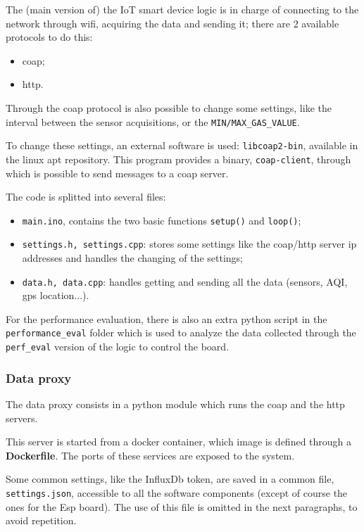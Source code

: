 \documentclass[]{article}
\begin{document}
The (main version of) the IoT smart device logic is in charge of connecting to the network through wifi, acquiring the data and sending it; there are 2 available protocols to do this:
\begin{itemize}
	\item coap;
	\item http.
\end{itemize}

Through the coap protocol is also possible to change some settings, like the interval between the sensor acquisitions, or the \texttt{MIN/MAX\_GAS\_VALUE}. 

To change these settings, an external software is used: \texttt{libcoap2-bin}, available in the linux apt repository. This program provides a binary, \texttt{coap-client}, through which is possible to send messages to a coap server. 


The code is splitted into several files:
\begin{itemize}
	\item \texttt{main.ino}, contains the two basic functions \texttt{setup()} and \texttt{loop()};
	\item \texttt{settings.h, settings.cpp}: stores some settings like the coap/http server ip addresses and handles the changing of the settings;
	\item \texttt{data.h, data.cpp}: handles getting and sending all the data (sensors, AQI, gps location...).
\end{itemize}

For the performance evaluation, there is also an extra python script in the \texttt{performance\_eval} folder which is used to analyze the data collected through the \texttt{perf\_eval} version of the logic to control the board. 

\subsubsection{Data proxy}
The data proxy consists in a python module which runs the coap and the http servers.

This server is started from a docker container, which image is defined through a \textbf{Dockerfile}. The ports of these services are exposed to the system. 

Some common settings, like the InfluxDb token, are saved in a common file, \texttt{settings.json}, accessible to all the software components (except of course the ones for the Esp board). The use of this file is omitted in the next paragraphs, to avoid repetition.
\end{document}
